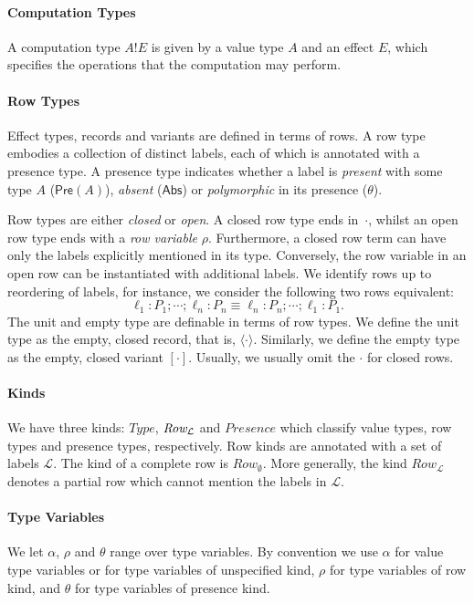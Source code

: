 \documentclass[mscres,cdtppar,twoside,openright,logo,rightchapter,normalheadings]{infthesis}
\theoremstyle{definition}
\newcommand{\Record}[1]{\ensuremath{\langle #1 \rangle}}
\newcommand{\Pre}[1]{\mathsf{Pre}(#1)}
\newcommand{\Abs}{\mathsf{Abs}}
\newcommand{\eff}{!}
\begin{document}
\paragraph{Computation Types}
A computation type $A \eff E$ is given by a value type $A$ and an
effect $E$, which specifies the operations that the computation may
perform.

\paragraph{Row Types}
Effect types, records and variants are defined in terms of rows.
A row type embodies a collection of distinct labels, each of which is
annotated with a presence type. A presence type indicates whether a
label is \emph{present} with some type $A$ ($\Pre{A}$), \emph{absent}
($\Abs$) or \emph{polymorphic} in its presence ($\theta$).

Row types are either \emph{closed} or \emph{open}. A closed row type
ends in~$\cdot$, whilst an open row type ends with a \emph{row
  variable} $\rho$. Furthermore, a closed row term can have only the
labels explicitly mentioned in its type. Conversely, the row variable
in an open row can be instantiated with additional labels. We identify
rows up to reordering of labels, for instance, we consider the
following two rows equivalent:
\[ \ell_1 : P_1; \cdots; \ell_n : P_n \equiv \ell_n : P_n; \cdots ; \ell_1 : P_1. \]
The unit and empty type are definable in terms of row types. We define
the unit type as the empty, closed record, that is,
$\Record{\cdot}$. Similarly, we define the empty type as the empty,
closed variant $[\cdot]$. Usually, we usually omit the $\cdot$ for
closed rows.

\paragraph{Kinds}
We have three kinds: $Type$, $\emph{Row}_\mathcal{L}$ and $Presence$
which classify value types, row types and presence types,
respectively. Row kinds are annotated with a set of labels
$\mathcal{L}$. The kind of a complete row is
$Row_{\mathcal{\emptyset}}$. More generally, the kind
$Row_{\mathcal{L}}$ denotes a partial row which cannot mention the
labels in $\mathcal{L}$.
%

\paragraph{Type Variables}
We let $\alpha$, $\rho$ and $\theta$ range over type variables. By
convention we use $\alpha$ for value type variables or for type
variables of unspecified kind, $\rho$ for type variables of row kind,
and $\theta$ for type variables of presence kind.
\end{document}
